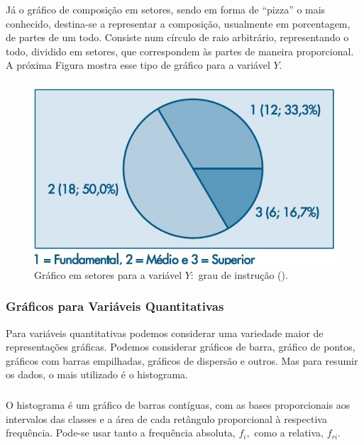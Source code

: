 \documentclass[14pt,aspectratio=1610]{beamer}
\begin{document}
\begin{frame}{}
\frametitle{}
\begin{block}{}
\justifying
Já o gráfico de composição em setores, sendo em forma de “pizza” o mais conhecido,
destina-se a representar a composição, usualmente em porcentagem, de partes de um todo.
Consiste num círculo de raio arbitrário, representando o todo, dividido em setores, que
correspondem às partes de maneira proporcional. A próxima Figura mostra esse tipo de gráfico para a variável $Y.$
\end{block}
\end{frame}

\begin{frame}{}
\frametitle{}
\begin{block}{}
\justifying
\begin{figure}[H]
    \centering
    \includegraphics[scale=0.5]{Fig4}
    \caption{Gráfico em setores para a variável $Y:$ grau de instrução (\cite{Morettin09}).}
    \label{Fig4_ex}
  \end{figure}
\end{block}
\end{frame}

\begin{frame}{}
\frametitle{Gráficos para Variáveis Quantitativas}
\begin{block}{}
\justifying
Para variáveis quantitativas podemos considerar uma variedade maior de representações
gráficas. Podemos considerar gráficos de barra, gráfico de pontos, gráficos com barras 
empilhadas, gráficos de dispersão e outros. Mas para resumir os dados, o mais utilizado 
é o histograma.
\end{block}
\end{frame}

\begin{frame}{}
\frametitle{}
\begin{block}{}
\justifying
O histograma é um gráfico de barras contíguas, com as bases proporcionais aos intervalos
das classes e a área de cada retângulo proporcional à respectiva frequência. Pode-se
usar tanto a frequência absoluta, $f_{i},$ como a relativa, $f_{ri}.$
\end{block}
\end{frame}
\end{document}
